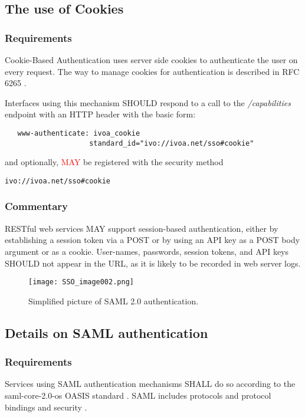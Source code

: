 \documentclass[11pt,a4paper]{ivoa}
\begin{document}
\subsection{The use of Cookies}
\subsubsection{Requirements}
Cookie-Based Authentication uses server side cookies to authenticate the
user on every request.
The way to manage  cookies for authentication is described in RFC 6265
\citep{std:RFC6265}.

Interfaces using this mechanism SHOULD respond to a call to the
\emph{/capabilities} endpoint with an HTTP header with the basic form:
\begin{verbatim}
   www-authenticate: ivoa_cookie
                    standard_id="ivo://ivoa.net/sso#cookie"
\end{verbatim}

\noindent and optionally, \textcolor{red}{MAY} be registered with the security
method

\texttt{ivo://ivoa.net/sso\#cookie}


\subsubsection{Commentary}
RESTful web services MAY support session-based authentication, either
by establishing a session token via a POST or
by using an API key as a POST body argument or as a cookie.
User-names, passwords, session tokens, and API keys SHOULD not appear in
the URL,
as it is likely to be recorded in web server logs.

\begin{figure}
\centering
\texttt{[image: SSO\_image002.png]}
\caption{Simplified picture of SAML 2.0 authentication.}
\label{fig:saml}
\end{figure}

\subsection{Details on SAML authentication}
\subsubsection{Requirements}
Services using SAML authentication mechanisms SHALL do so according to
the
saml-core-2.0-os OASIS standard \citep{std:SAML}.
SAML includes protocols and protocol bindings and security
\citep{std:SAMLB}.
\end{document}
